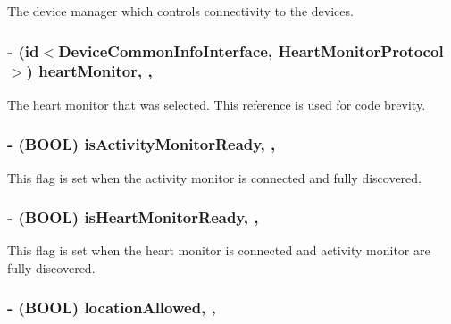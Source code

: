The device manager which controls connectivity to the devices. \hypertarget{interface_device_poll_manager_a5d06bcab588b72afdf5fce4c102afe91}{
\subsubsection[{heart\-Monitor}]{\setlength{\rightskip}{0pt plus 5cm}-\/ (id$<${\bf Device\-Common\-Info\-Interface}, {\bf Heart\-Monitor\-Protocol}$>$) heart\-Monitor\hspace{0.3cm}{\ttfamily [read]}, {\ttfamily [write]}, {\ttfamily [atomic]}}}\label{interface_device_poll_manager_a5d06bcab588b72afdf5fce4c102afe91}
The heart monitor that was selected. This reference is used for code brevity. \hypertarget{interface_device_poll_manager_aeab69bf0530fcf7d3f1b01c785e17bd2}{
\subsubsection[{is\-Activity\-Monitor\-Ready}]{\setlength{\rightskip}{0pt plus 5cm}-\/ (B\-O\-O\-L) is\-Activity\-Monitor\-Ready\hspace{0.3cm}{\ttfamily [read]}, {\ttfamily [write]}, {\ttfamily [atomic]}}}\label{interface_device_poll_manager_aeab69bf0530fcf7d3f1b01c785e17bd2}
This flag is set when the activity monitor is connected and fully discovered. \hypertarget{interface_device_poll_manager_a4735e7c0b634e8693ac8d33a0456d39f}{
\subsubsection[{is\-Heart\-Monitor\-Ready}]{\setlength{\rightskip}{0pt plus 5cm}-\/ (B\-O\-O\-L) is\-Heart\-Monitor\-Ready\hspace{0.3cm}{\ttfamily [read]}, {\ttfamily [write]}, {\ttfamily [atomic]}}}\label{interface_device_poll_manager_a4735e7c0b634e8693ac8d33a0456d39f}
This flag is set when the heart monitor is connected and activity monitor are fully discovered. \hypertarget{interface_device_poll_manager_a0e9aad6cc4f5a99aff27b0a64ae76d19}{
\subsubsection[{location\-Allowed}]{\setlength{\rightskip}{0pt plus 5cm}-\/ (B\-O\-O\-L) location\-Allowed\hspace{0.3cm}{\ttfamily [read]}, {\ttfamily [write]}, {\ttfamily [atomic]}}}\label{interface_device_poll_manager_a0e9aad6cc4f5a99aff27b0a64ae76d19}
